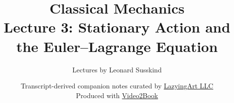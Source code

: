 \documentclass[11pt,oneside]{book}
\begin{document}
\hypersetup{pageanchor=false}
\frontmatter
\title{Classical Mechanics\\[0.45em]
\large Lecture 3: Stationary Action and the Euler--Lagrange Equation}
\author{Lectures by Leonard Susskind}
\date{Transcript-derived companion notes curated by
\href{https://lazying.art}{LazyingArt LLC}\\[0.35em]
\small Produced with
\href{https://github.com/lachlanchen/Video2Book}{Video2Book}}
\maketitle
\hypersetup{pageanchor=true}
\mainmatter

\end{document}

